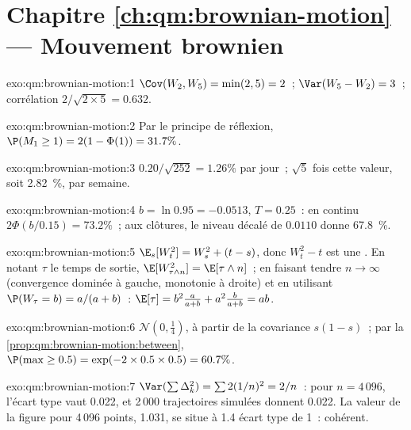 \section*{Chapitre \ref{ch:qm:brownian-motion} --- Mouvement brownien}

\begin{solution}{exo:qm:brownian-motion:1}
$\Cov(W_2, W_5) = \min(2,5) = 2$~; $\Var(W_5 - W_2) = 3$~; corrélation $2/\sqrt{2 \times 5} = 0.632$.
\end{solution}

\begin{solution}{exo:qm:brownian-motion:2}
Par le principe de réflexion, $\P(M_1 \ge 1) = 2(1 - \Phi(1)) = 31.7\%$.
\end{solution}

\begin{solution}{exo:qm:brownian-motion:3}
$0.20/\sqrt{252} = 1.26\%$ par jour~; $\sqrt5$ fois cette valeur, soit 2.82~\%, par semaine.
\end{solution}

\begin{solution}{exo:qm:brownian-motion:4}
$b = \ln 0.95 = -0.0513$, $T = 0.25$~: en continu $2\Phi(b/0.15) = 73.2\%$~; aux clôtures, le
niveau décalé de $0.0110$ donne 67.8~\%.
\end{solution}

\begin{solution}{exo:qm:brownian-motion:5}
$\E_s[W_t^2] = W_s^2 + (t - s)$, donc $W_t^2 - t$ est une . En notant $\tau$ le temps de sortie,
$\E[W_{\tau\wedge n}^2] = \E[\tau \wedge n]$~; en faisant tendre $n \to \infty$ (convergence dominée à
gauche, monotonie à droite) et en utilisant $\P(W_\tau = b) = a/(a+b)$~: $\E[\tau] = b^2\frac{a}{a+b} +
a^2\frac{b}{a+b} = ab$.
\end{solution}

\begin{solution}{exo:qm:brownian-motion:6}
$\mathcal N(0, \tfrac14)$, à partir de la covariance $s(1 - s)$~; par
la \cref{prop:qm:brownian-motion:between}, $\P(\max \ge 0.5) = \exp(-2 \times 0.5 \times 0.5) = 60.7\%$.
\end{solution}

\begin{solution}{exo:qm:brownian-motion:7}
$\Var(\sum\Delta_k^2) = \sum 2(1/n)^2 = 2/n$~: pour $n = 4\,096$, l'écart type vaut 0.022, et
2\,000 trajectoires simulées donnent 0.022. La valeur de la figure pour 4\,096 points, 1.031, se situe
à 1.4 écart type de 1~: cohérent.
\end{solution}

